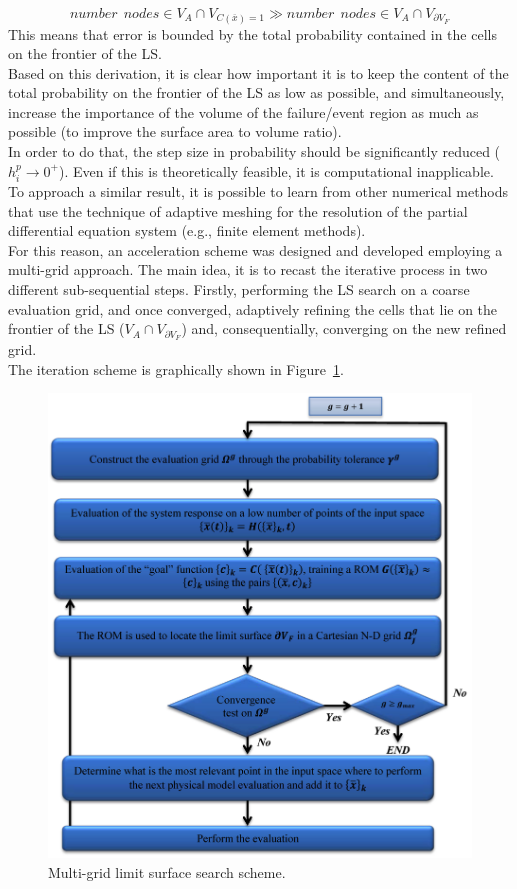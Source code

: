 \begin{equation}
number \: \:  nodes \in V_{A} \cap V_{C(\overline{x})=1} \gg number \: \:  nodes  \in V_{A} \cap V_{\partial V_{F}}
\end{equation}
This means that error is bounded by the total probability contained in the cells on the frontier of the LS.
\\Based on this derivation, it is clear how important it is to keep the 
content of the total probability on the frontier of the LS as low as 
possible, and simultaneously, increase the importance of the volume of 
the failure/event region as much as possible (to improve the surface 
area to volume ratio).
\\In order to do that, the step size in probability should be significantly 
reduced ( $h_{i}^{p} \rightarrow 0^{+}$). Even if this is theoretically 
feasible, it is computational inapplicable. To approach a similar result, it 
is possible to learn from other numerical methods that use the 
technique of adaptive meshing for the resolution of the partial 
differential equation system (e.g., finite element methods).
\\For this reason, an acceleration scheme was designed and developed 
employing a multi-grid approach. The main idea, it is to recast the 
iterative process in two different sub-sequential steps. Firstly, 
performing the LS search on a coarse evaluation grid, and once 
converged, adaptively refining the cells that lie on the frontier of the LS 
($V_{A} \cap V_{\partial V_{F}}$) and, consequentially, converging on 
the new refined grid.
\\The iteration scheme is graphically shown in 
Figure~\ref{fig:LimitSurfaceMultiGridAlgoFlow}.
\begin{figure}[h!]
  \centering
  \includegraphics[width=1.0\textwidth]  {pics/LimitSurfaceMultiGridAlgoFlow.png}
  \caption{Multi-grid limit surface search scheme.}
  \label{fig:LimitSurfaceMultiGridAlgoFlow}
\end{figure}

